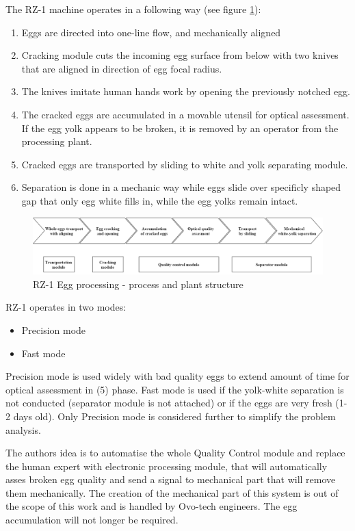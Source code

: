\documentclass[12pt,twoside,a4paper]{article}
\begin{document}
The RZ-1 machine operates in a following way (see figure \ref{fig:process}):
\begin{enumerate}
\item Eggs are directed into one-line flow, and mechanically aligned

\item Cracking module cuts the incoming egg surface from below with two knives that are aligned in direction of egg focal radius.
\item The knives imitate human hands work by opening the previously notched egg.
\item The cracked eggs are accumulated in a movable utensil for optical assessment. 
If the egg yolk appears to be broken, it is removed by an operator from the processing plant.
\item Cracked eggs are transported by sliding to white and yolk separating module.
\item Separation  is done in a mechanic way while eggs slide over specificly shaped gap that only egg white fills in, while the egg yolks remain intact.
\end{enumerate}

\begin{figure}[H]
\centering
\includegraphics[width=0.8\paperwidth]{process}
\caption{RZ-1 Egg processing  - process and plant structure}\label{fig:process}

\end{figure}
RZ-1 operates in two modes:
\begin{itemize}
\item Precision mode
\item Fast mode
\end{itemize}
Precision mode is used widely with bad quality eggs to extend amount of time for optical assessment in (5) phase.
Fast mode is used if the yolk-white separation is not conducted (separator module is not attached) or if the eggs are very fresh (1-2 days old).
Only Precision mode is considered further to simplify the problem analysis.

The authors idea is to automatise the whole Quality Control module and replace the human expert with electronic processing module, that will automatically asses broken egg quality and send a signal to mechanical part that will remove them mechanically.
The creation of the mechanical part of this system is out of the scope of this work and is handled by Ovo-tech engineers.
The egg accumulation will not longer be required.
\end{document}
